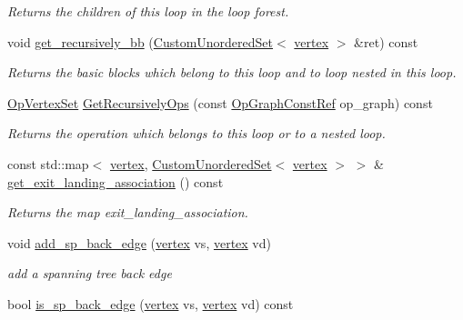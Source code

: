 \begin{DoxyCompactItemize}
\begin{DoxyCompactList}\small\item\em Returns the children of this loop in the loop forest. \end{DoxyCompactList}\item 
void \hyperlink{classLoop_a8c396bce6167020b05c88ce09d59999b}{get\+\_\+recursively\+\_\+bb} (\hyperlink{classCustomUnorderedSet}{Custom\+Unordered\+Set}$<$ \hyperlink{graph_8hpp_abefdcf0544e601805af44eca032cca14}{vertex} $>$ \&ret) const
\begin{DoxyCompactList}\small\item\em Returns the basic blocks which belong to this loop and to loop nested in this loop. \end{DoxyCompactList}\item 
\hyperlink{classOpVertexSet}{Op\+Vertex\+Set} \hyperlink{classLoop_a03dccc95debe3862b1827f28585300c8}{Get\+Recursively\+Ops} (const \hyperlink{op__graph_8hpp_a9a0b240622c47584bee6951a6f5de746}{Op\+Graph\+Const\+Ref} op\+\_\+graph) const
\begin{DoxyCompactList}\small\item\em Returns the operation which belongs to this loop or to a nested loop. \end{DoxyCompactList}\item 
const std\+::map$<$ \hyperlink{graph_8hpp_abefdcf0544e601805af44eca032cca14}{vertex}, \hyperlink{classCustomUnorderedSet}{Custom\+Unordered\+Set}$<$ \hyperlink{graph_8hpp_abefdcf0544e601805af44eca032cca14}{vertex} $>$ $>$ \& \hyperlink{classLoop_a54479dad14b619a07e80043aec79bcac}{get\+\_\+exit\+\_\+landing\+\_\+association} () const
\begin{DoxyCompactList}\small\item\em Returns the map exit\+\_\+landing\+\_\+association. \end{DoxyCompactList}\item 
void \hyperlink{classLoop_acc9866346319ea64ee23f01a67335018}{add\+\_\+sp\+\_\+back\+\_\+edge} (\hyperlink{graph_8hpp_abefdcf0544e601805af44eca032cca14}{vertex} vs, \hyperlink{graph_8hpp_abefdcf0544e601805af44eca032cca14}{vertex} vd)
\begin{DoxyCompactList}\small\item\em add a spanning tree back edge \end{DoxyCompactList}\item 
bool \hyperlink{classLoop_aecc040c0dae0d26555f742ce80f703c4}{is\+\_\+sp\+\_\+back\+\_\+edge} (\hyperlink{graph_8hpp_abefdcf0544e601805af44eca032cca14}{vertex} vs, \hyperlink{graph_8hpp_abefdcf0544e601805af44eca032cca14}{vertex} vd) const

\end{DoxyCompactItemize}
